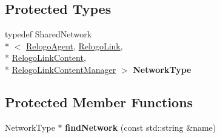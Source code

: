 \subsection*{Protected Types}
\begin{DoxyCompactItemize}
\item 
\hypertarget{classrepast_1_1relogo_1_1_observer_adc2f684d3c7a6a745954daf4b5d946ce}{typedef Shared\-Network\\*
$<$ \hyperlink{classrepast_1_1relogo_1_1_relogo_agent}{Relogo\-Agent}, \hyperlink{classrepast_1_1relogo_1_1_relogo_link}{Relogo\-Link}, \\*
\hyperlink{classrepast_1_1relogo_1_1_relogo_link_content}{Relogo\-Link\-Content}, \\*
\hyperlink{classrepast_1_1relogo_1_1_relogo_link_content_manager}{Relogo\-Link\-Content\-Manager} $>$ {\bfseries Network\-Type}}\label{classrepast_1_1relogo_1_1_observer_adc2f684d3c7a6a745954daf4b5d946ce}

\end{DoxyCompactItemize}
\subsection*{Protected Member Functions}
\begin{DoxyCompactItemize}
\item 
\hypertarget{classrepast_1_1relogo_1_1_observer_a9a6da36977fc44e0364be1d7032055ca}{Network\-Type $\ast$ {\bfseries find\-Network} (const std\-::string \&name)}\label{classrepast_1_1relogo_1_1_observer_a9a6da36977fc44e0364be1d7032055ca}

\end{DoxyCompactItemize}
